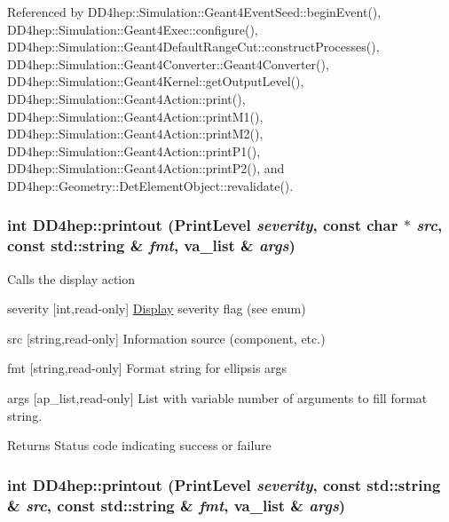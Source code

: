 Referenced by DD4hep::Simulation::Geant4EventSeed::beginEvent(), DD4hep::Simulation::Geant4Exec::configure(), DD4hep::Simulation::Geant4DefaultRangeCut::constructProcesses(), DD4hep::Simulation::Geant4Converter::Geant4Converter(), DD4hep::Simulation::Geant4Kernel::getOutputLevel(), DD4hep::Simulation::Geant4Action::print(), DD4hep::Simulation::Geant4Action::printM1(), DD4hep::Simulation::Geant4Action::printM2(), DD4hep::Simulation::Geant4Action::printP1(), DD4hep::Simulation::Geant4Action::printP2(), and DD4hep::Geometry::DetElementObject::revalidate().\hypertarget{namespace_d_d4hep_a1ad7a8f6ac790c5d06c8dc2e2c9bf656}{
\subsubsection[{printout}]{\setlength{\rightskip}{0pt plus 5cm}int DD4hep::printout (PrintLevel {\em severity}, \/  const char $\ast$ {\em src}, \/  const std::string \& {\em fmt}, \/  va\_\-list \& {\em args})}}
\label{namespace_d_d4hep_a1ad7a8f6ac790c5d06c8dc2e2c9bf656}
Calls the display action \begin{DoxyItemize}
\item severity \mbox{[}int,read-\/only\mbox{]} \hyperlink{class_d_d4hep_1_1_display}{Display} severity flag (see enum) \item src \mbox{[}string,read-\/only\mbox{]} Information source (component, etc.) \item fmt \mbox{[}string,read-\/only\mbox{]} Format string for ellipsis args \item args \mbox{[}ap\_\-list,read-\/only\mbox{]} List with variable number of arguments to fill format string. \begin{DoxyReturn}{Returns}
Status code indicating success or failure 
\end{DoxyReturn}
\end{DoxyItemize}
\hypertarget{namespace_d_d4hep_a7cb4c929065e6f4c054748cfcdc90f9c}{
\subsubsection[{printout}]{\setlength{\rightskip}{0pt plus 5cm}int DD4hep::printout (PrintLevel {\em severity}, \/  const std::string \& {\em src}, \/  const std::string \& {\em fmt}, \/  va\_\-list \& {\em args})}}
\label{namespace_d_d4hep_a7cb4c929065e6f4c054748cfcdc90f9c}
